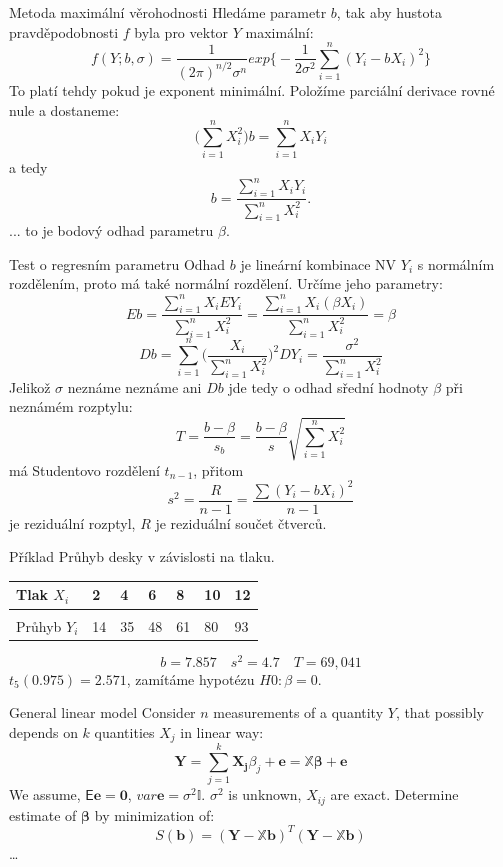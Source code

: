 \documentclass[smaller]{beamer}
\def\vc#1{\mathbf{\boldsymbol{#1}}}     %
\def\tn#1{{\mathbb{#1}}}    %
\def\E{\vc{\mathsf{E}}}
\begin{document}
\begin{frame}{Metoda maximální věrohodnosti}
 Hledáme parametr $b$, tak aby hustota pravděpodobnosti $f$ byla pro vektor $Y$ maximální:
 \[
   f(Y;b,\sigma) = \frac{1}{(2\pi)^{n/2}\sigma^n} exp\Big\{ -\frac{1}{2\sigma^2} \sum_{i=1}^{n} (Y_i - b X_i)^2 \Big\}
 \]
 To platí tehdy pokud je exponent minimální. Položíme parciální derivace rovné nule a dostaneme:
 \[
    \big(\sum_{i=1}^n X_i^2\big) b = \sum_{i=1}^n X_iY_i 
 \]
 a tedy 
\[ 
   b = \frac{\sum_{i=1}^n X_iY_i}{\sum_{i=1}^n X_i^2}.
\]
... to je bodový odhad parametru $\beta$.
\end{frame}

\begin{frame}{Test o regresním parametru}
Odhad $b$ je lineární kombinace NV $Y_i$ s normálním rozdělením, proto má také normální rozdělení. Určíme jeho parametry:
\[
 E b = \frac{\sum_{i=1}^n X_i E Y_i}{\sum_{i=1}^n X_i^2} = \frac{\sum_{i=1}^n X_i (\beta X_i)}{\sum_{i=1}^n X_i^2} =\beta
\]
\[
 D b = \sum_{i=1}^n \Big(\frac{X_i}{\sum_{i=1}^n X_i^2}\Big)^2 D Y_i = \frac{\sigma^2}{{\sum_{i=1}^n X_i^2}}
\]
Jelikož $\sigma$ neznáme neznáme ani $D b$ jde tedy o odhad sřední hodnoty $\beta$ při neznámém rozptylu:
\[
 T = \frac{b-\beta}{s_b} = \frac{b - \beta}{s} \sqrt{\sum_{i=1}^n X_i^2}
\]
má Studentovo rozdělení $t_{n-1}$, přitom
\[
 s^2 = \frac{R}{n-1} = \frac{\sum (Y_i - b X_i)^2}{n-1}
\]
je reziduální rozptyl, $R$ je reziduální součet čtverců. 
\end{frame}


\begin{frame}{Příklad}
 Průhyb desky v závislosti na tlaku.
\begin{center}
\begin{tabular}{l|llllll}
Tlak $X_i$ & 2 & 4 & 6 & 8 & 10 & 12\\
\hline\\
Průhyb $Y_i$ & 14 & 35 & 48 & 61 & 80 & 93\\
\end{tabular}
\end{center}

\[
  b = 7.857\quad s^2 = 4.7\quad T = 69,041
\]
$t_5(0.975) = 2.571$, zamítáme hypotézu $H0: \beta = 0$. 

\end{frame}

\begin{frame}{General linear model}
Consider $n$ measurements of a quantity $Y$, that possibly depends on $k$ quantities $X_j$  in linear way:
\[
   \vc{Y} = \sum_{j=1}^k \vc{X_j} \beta_j + \vc{e} = \tn X \vc{\beta} + \vc e
\]
We assume, $\E \vc e = \vc 0$, $var \vc e = \sigma^2 \tn I$. $\sigma^2$ is unknown, $X_{ij}$ are exact.
Determine estimate of $\vc \beta$ by minimization of:
\[
   S(\vc b) = (\vc Y -\tn X\vc b)^T (\vc Y - \tn X\vc b)
\]
\dots

\end{frame}
\end{document}
